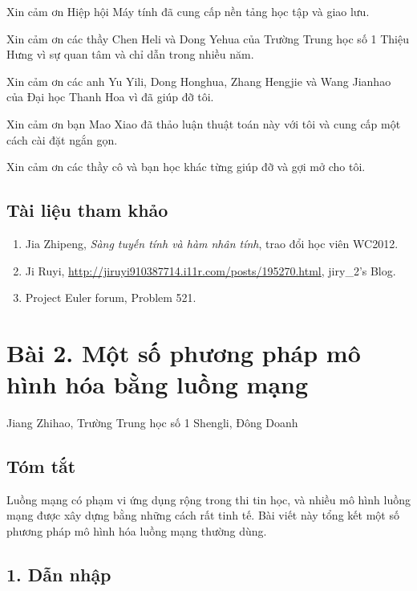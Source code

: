 \documentclass[11pt]{article}
\begin{document}
Xin cảm ơn Hiệp hội Máy tính đã cung cấp nền tảng học tập và giao lưu.

Xin cảm ơn các thầy Chen Heli và Dong Yehua của Trường Trung học số 1 Thiệu
Hưng vì sự quan tâm và chỉ dẫn trong nhiều năm.

Xin cảm ơn các anh Yu Yili, Dong Honghua, Zhang Hengjie và Wang Jianhao của
Đại học Thanh Hoa vì đã giúp đỡ tôi.

Xin cảm ơn bạn Mao Xiao đã thảo luận thuật toán này với tôi và cung cấp một
cách cài đặt ngắn gọn.

Xin cảm ơn các thầy cô và bạn học khác từng giúp đỡ và gợi mở cho tôi.

\subsection*{Tài liệu tham khảo}

\begin{enumerate}
  \item Jia Zhipeng, \emph{Sàng tuyến tính và hàm nhân tính}, trao đổi học
  viên WC2012.
  \item Ji Ruyi, \url{http://jiruyi910387714.i11r.com/posts/195270.html},
  jiry\_2's Blog.
  \item Project Euler forum, Problem 521.
\end{enumerate}

\section*{Bài 2. Một số phương pháp mô hình hóa bằng luồng mạng}

\begin{center}
Jiang Zhihao, Trường Trung học số 1 Shengli, Đông Doanh
\end{center}

\subsection*{Tóm tắt}

Luồng mạng có phạm vi ứng dụng rộng trong thi tin học, và nhiều mô hình luồng
mạng được xây dựng bằng những cách rất tinh tế. Bài viết này tổng kết một số
phương pháp mô hình hóa luồng mạng thường dùng.

\subsection*{1. Dẫn nhập}
\end{document}

